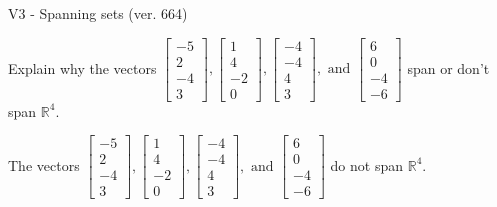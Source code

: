 \begin{exercise}
  \begin{exerciseTitle}V3 - Spanning sets (ver. 664)\end{exerciseTitle}
  \begin{exerciseStatement}
    Explain why the vectors \(\left[\begin{array}{r}
-5 \\
2 \\
-4 \\
3
\end{array}\right] , \left[\begin{array}{r}
1 \\
4 \\
-2 \\
0
\end{array}\right] , \left[\begin{array}{r}
-4 \\
-4 \\
4 \\
3
\end{array}\right] , \text{ and } \left[\begin{array}{r}
6 \\
0 \\
-4 \\
-6
\end{array}\right]\) span or don't span \(\mathbb{R}^4\). 
	


  \end{exerciseStatement}
  \begin{exerciseAnswer}
   The vectors \(\left[\begin{array}{r}
-5 \\
2 \\
-4 \\
3
\end{array}\right] , \left[\begin{array}{r}
1 \\
4 \\
-2 \\
0
\end{array}\right] , \left[\begin{array}{r}
-4 \\
-4 \\
4 \\
3
\end{array}\right] , \text{ and } \left[\begin{array}{r}
6 \\
0 \\
-4 \\
-6
\end{array}\right]\) 
  	 do not  
	span \(\mathbb{R}^4\).
  


  \end{exerciseAnswer}
\end{exercise}